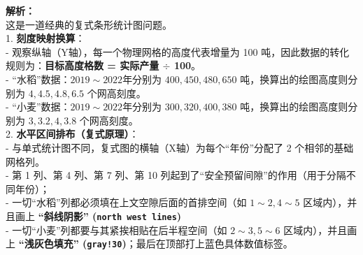 \begin{center}
\end{center}

\vspace{0.8cm}

{\small\color{gray}
\textbf{解析：}\\
这是一道经典的复式条形统计图问题。\\
1. \textbf{刻度映射换算}：\\
- 观察纵轴（Y轴），每一个物理网格的高度代表增量为 100 吨，因此数据的转化规则为：\textbf{目标高度格数 = 实际产量 $\div$ 100}。\\
- “水稻”数据：$2019\sim 2022$年分别为 $400, 450, 480, 650$ 吨，换算出的绘图高度则分别为 $4, 4.5, 4.8, 6.5$ 个网高刻度。\\
- “小麦”数据：$2019\sim 2022$年分别为 $300, 320, 400, 380$ 吨，换算出的绘图高度则分别为 $3, 3.2, 4, 3.8$ 个网高刻度。\\
2. \textbf{水平区间排布（复式原理）}：\\
- 与单式统计图不同，复式图的横轴（X轴）为每个“年份”分配了 2 个相邻的基础网格列。\\
- 第 1 列、第 4 列、第 7 列、第 10 列起到了“安全预留间隙”的作用（用于分隔不同年份）；\\
- 一切“水稻”列都必须填在上文空隙后面的首排空间（如 $1\sim2, 4\sim5$ 区域内），并且画上 \textbf{“斜线阴影” (\texttt{north west lines})}\\
- 一切“小麦”列都要与其紧挨相贴在后半程空间（如 $2\sim3, 5\sim6$ 区域内），并且画上 \textbf{“浅灰色填充” (\texttt{gray!30})}；最后在顶部打上蓝色具体数值标签。
}

